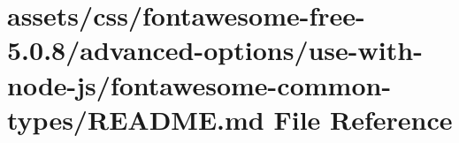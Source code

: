 \hypertarget{css_2fontawesome-free-5_80_88_2advanced-options_2use-with-node-js_2fontawesome-common-types_2_r_e_a_d_m_e_8md}{}\section{assets/css/fontawesome-\/free-\/5.0.8/advanced-\/options/use-\/with-\/node-\/js/fontawesome-\/common-\/types/\+R\+E\+A\+D\+ME.md File Reference}
\label{css_2fontawesome-free-5_80_88_2advanced-options_2use-with-node-js_2fontawesome-common-types_2_r_e_a_d_m_e_8md}
